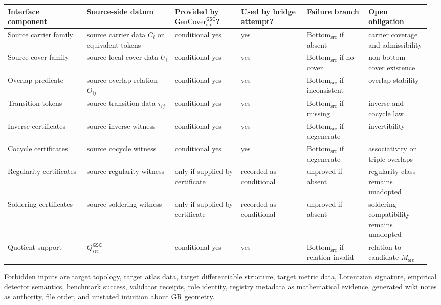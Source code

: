 \documentclass[11pt]{article}
\newcommand{\GSC}{\mathsf{GSC}}
\newcommand{\Msrc}{M_{\mathrm{src}}}
\newcommand{\Qsrc}{Q_{\mathrm{src}}}
\newcommand{\Bottomsrc}{\mathrm{Bottom}_{\mathrm{src}}}
\newcommand{\GenCover}{\mathrm{GenCover}_{\mathrm{src}}^{\GSC}}
\begin{document}
\begin{longtable}{|p{0.18\linewidth}|p{0.20\linewidth}|p{0.15\linewidth}|p{0.15\linewidth}|p{0.14\linewidth}|p{0.14\linewidth}|}
\hline
\textbf{Interface component} & \textbf{Source-side datum} &
\textbf{Provided by \(\GenCover\)?} & \textbf{Used by bridge attempt?} &
\textbf{Failure branch} & \textbf{Open obligation} \\
\hline
Source carrier family & source carrier data \(C_i\) or equivalent tokens &
conditional yes & yes & \(\Bottomsrc\) if absent & carrier coverage and admissibility \\
\hline
Source cover family & source-local cover data \(U_i\) & conditional yes &
yes & \(\Bottomsrc\) if no cover & non-bottom cover existence \\
\hline
Overlap predicate & source overlap relation \(O_{ij}\) & conditional yes &
yes & \(\Bottomsrc\) if inconsistent & overlap stability \\
\hline
Transition tokens & source transition data \(\tau_{ij}\) & conditional yes &
yes & \(\Bottomsrc\) if missing & inverse and cocycle law \\
\hline
Inverse certificates & source inverse witness & conditional yes & yes &
\(\Bottomsrc\) if degenerate & invertibility \\
\hline
Cocycle certificates & source cocycle witness & conditional yes & yes &
\(\Bottomsrc\) if degenerate & associativity on triple overlaps \\
\hline
Regularity certificates & source regularity witness & only if supplied by
certificate & recorded as conditional & unproved if absent &
regularity class remains unadopted \\
\hline
Soldering certificates & source soldering witness & only if supplied by
certificate & recorded as conditional & unproved if absent &
soldering compatibility remains unadopted \\
\hline
Quotient support & \(\Qsrc^{\GSC}\) & conditional yes & yes &
\(\Bottomsrc\) if relation invalid & relation to candidate \(\Msrc\) \\
\hline
\end{longtable}

Forbidden inputs are target topology, target atlas data, target differentiable
structure, target metric data, Lorentzian signature, empirical detector
semantics, benchmark success, validator receipts, role identity, registry
metadata as mathematical evidence, generated wiki notes as authority, file
order, and unstated intuition about GR geometry.
\end{document}
